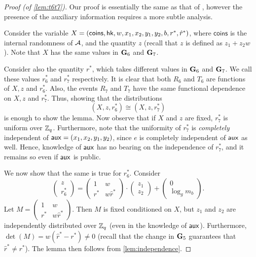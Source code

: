 \begin{proof}[Proof (of \cref{lem:t6t7})]
	Our proof is essentially the same as that of \cite{cs01}, however the presence of the auxiliary information requires a more subtle analysis.
	
	Consider the variable $X=(\mathsf{coins},\mathsf{hk},w,x_1,x_2,y_1,y_2,b,r^{*},\hat{r}^{*})$, where $\mathsf{coins}$ is the internal randomness of $\mathcal{A}$, and the quantity $z$ (recall that $z$ is defined as $z_1+z_2w$). Note that $X$ has the same values in $\mathbf{G}_6$ and $\mathbf{G}_7$.
	
	Consider also the quantity $r^{*}$, which takes different values in $\mathbf{G}_6$ and $\mathbf{G}_7$. We call these values $r_6^{*}$ and $r^{*}_7$ respectively. It is clear that both $R_6$ and $T_6$ are functions of $X,z$ and $r^{*}_6$. Also, the events $R_7$ and $T_7$ have the same functional dependence on $X,z$ and $r^{*}_7$. Thus, showing that the distributions
	$$(X, z, r^{*}_6)\cong(X, z, r^{*}_7)$$ is enough to show the lemma. Now observe that if $X$ and $z$ are fixed, $r^{*}_7$ is uniform over $\mathbb{Z}_q$. Furthermore, note that the uniformity of $r^{*}_7$ is \textit{completely} independent of $\mathsf{aux} = (x_1,x_2,y_1,y_2)$, since $e$ is completely independent of $\mathsf{aux}$ as well. Hence, knowledge of $\mathsf{aux}$ has no bearing on the independence of $r^{*}_7$, and it remains so even if $\mathsf{aux}$ is public.
	
	We now show that the same is true for $r^{*}_6$. Consider
	\begin{equation*}
		\begin{pmatrix}
			z\\
			r^{*}_6
		\end{pmatrix}=
		\begin{pmatrix}
			1 & w\\
			r^{*} & w\hat{r}^{*}
		\end{pmatrix}\cdot
		\begin{pmatrix}
			z_1\\
			z_2
		\end{pmatrix}+
		\begin{pmatrix}
			0\\
			\log_gm_{b}
		\end{pmatrix}.
	\end{equation*}
	 Let $M = \begin{pmatrix}
			1 & w\\
			r^{*} & w\hat{r}^{*}
		\end{pmatrix}$. Then $M$ is fixed conditioned on $X$, but $z_1$ and $z_2$ are independently distributed over $\mathbb{Z}_q$ (even in the knowledge of $\mathsf{aux}$). Furthermore, $\det(M) = w(\hat{r}^{*} - r^{*})\neq 0$ (recall that the change in $\mathbf{G}_5$ guarantees that $\hat{r}^* \neq r^*$). The lemma then follows from \cref{lem:independence}.
\end{proof}

